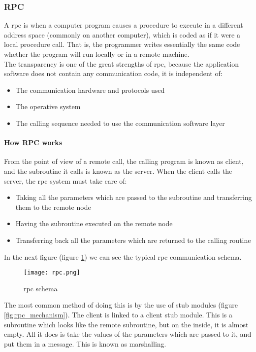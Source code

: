 \subsubsection{RPC}
A \acrfull{rpc}\cite{rpc} is when a computer program causes a procedure to execute in a different address space (commonly on another computer), which is coded as if it were a local procedure call. That is, the programmer writes essentially the same code whether the program will run locally or in a remote machine.\\

The transparency is one of the great strengths of \acrshort{rpc}, because the application software does not contain any communication code, it is independent of:
\begin{itemize}
    \item The communication hardware and protocols used
    \item The operative system
    \item The calling sequence needed to use the communication software layer
\end{itemize}

\paragraph{How RPC works}
From the point of view of a remote call, the calling program is known as client, and the subroutine it calls is known as the server\cite{rpcInOS,howRPC}. When the client calls the server, the \acrshort{rpc} system must take care of:
\begin{itemize}
    \item Taking all the parameters which are passed to the subroutine and transferring them to the remote node
    \item Having the subroutine executed on the remote node
    \item Transferring back all the parameters which are returned to the calling routine
\end{itemize}

In the next figure (figure \ref{fig:rpc_schema}) we can see the typical \acrshort{rpc} communication schema.
\begin{figure}[h]
    \centering
    \texttt{[image: rpc.png]}
    \caption{\acrshort{rpc} schema}
    \label{fig:rpc_schema}
\end{figure}
The most common method of doing this is by the use of stub modules (figure \ref{fig:rpc_mechanism}). The client is linked to a client stub module. This is a subroutine which looks like the remote subroutine, but on the inside, it is almost empty. All it does is take the values of the parameters which are passed to it, and put them in a message. This is known as marshalling.\\

